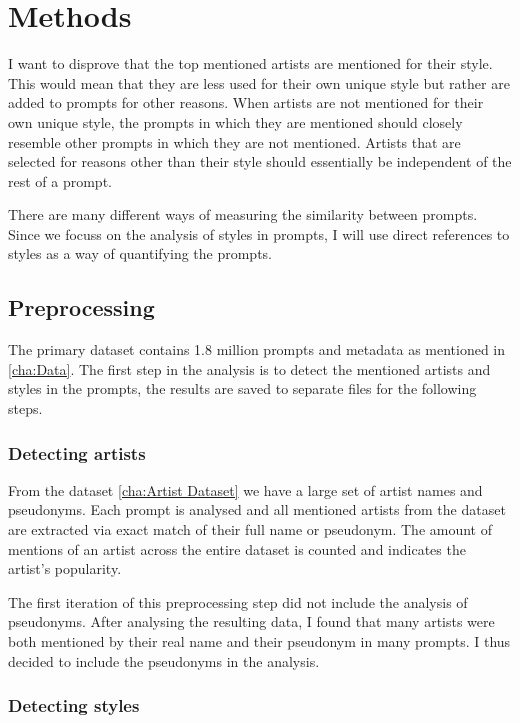 \chapter{Methods}
\label{cha:Methods}

I want to disprove that the top mentioned artists are mentioned for their style. This would mean that they are less used for their own unique style but rather are added to prompts for other reasons.
When artists are not mentioned for their own unique style, the prompts in which they are mentioned should closely resemble other prompts in which they are not mentioned. Artists that are selected for reasons other than their style should essentially be independent of the rest of a prompt.

There are many different ways of measuring the similarity between prompts. Since we focuss on the analysis of styles in prompts, I will use direct references to styles as a way of quantifying the prompts. 


\section{Preprocessing}

The primary dataset contains 1.8 million prompts and metadata as mentioned in \ref{cha:Data}. The first step in the analysis is to detect the mentioned artists and styles in the prompts, the results are saved to separate files for the following steps.

\subsection{Detecting artists}


From the dataset \ref{cha:Artist Dataset} we have a large set of artist names and pseudonyms. Each prompt is analysed and all mentioned artists from the dataset are extracted via exact match of their full name or pseudonym. The amount of mentions of an artist across the entire dataset is counted and indicates the artist's popularity.

The first iteration of this preprocessing step did not include the analysis of pseudonyms. After analysing the resulting data, I found that many artists were both mentioned by their real name and their pseudonym in many prompts. I thus decided to include the pseudonyms in the analysis.


\subsection{Detecting styles}


